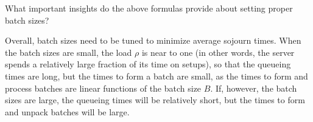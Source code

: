 \begin{exercise}
  What important insights do the above formulas provide about setting proper batch sizes?
  \begin{solution}
    Overall, batch sizes need to be tuned to minimize average sojourn times.
    When the batch sizes are small, the load $\rho$ is near to one (in other words, the server spends a relatively large fraction of its time on setups), so that the queueing times are long, but the times to form a batch are small, as the times to form and process batches are linear functions of the batch size $B$.
    If, however, the batch sizes are large, the queueing times will be relatively short, but the times to form and unpack batches will be large.
  \end{solution}
\end{exercise}



